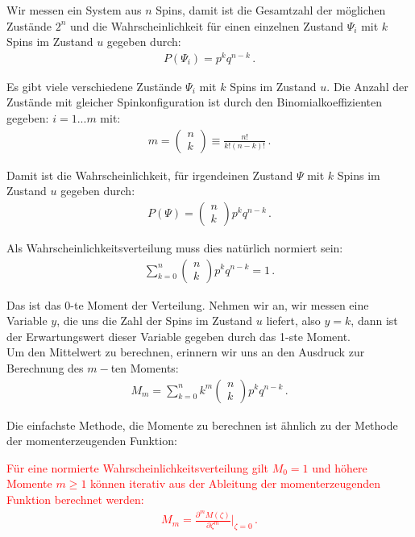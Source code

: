 Wir messen ein System aus $n$ Spins, damit ist die Gesamtzahl der möglichen Zustände $2^n$ und die Wahrscheinlichkeit für einen einzelnen Zustand $\Psi_i$ mit $k$ Spins im Zustand $u$ gegeben durch:
\begin{align}
P (\Psi_i) = p^k q^{n-k}\,.
\label{eq:vl5-4}
\end{align}

Es gibt viele verschiedene Zustände $\Psi_i$ mit $k$ Spins im Zustand $u$. Die Anzahl der Zustände mit gleicher Spinkonfiguration ist durch den Binomialkoeffizienten gegeben: $i = 1 ... m$ mit:
\begin{align}
m = \begin{pmatrix} n\\ k \end{pmatrix} \equiv \frac{ n! }{ k! (n - k)! }\,.
\label{eq:vl5-5}
\end{align}

Damit ist die Wahrscheinlichkeit, für irgendeinen Zustand $\Psi$ mit $k$ Spins im Zustand $u$ gegeben durch:
\begin{align}
P (\Psi) = \begin{pmatrix} n\\ k \end{pmatrix} p^k q^{n-k}\,.
\label{eq:vl5-6}
\end{align}

Als Wahrscheinlichkeitsverteilung muss dies natürlich normiert sein:
\begin{align}
\sum_{k = 0}^n \begin{pmatrix} n\\ k \end{pmatrix} p^k q^{n-k} = 1\,.
\label{eq:vl5-7}
\end{align}

Das ist das 0-te Moment der Verteilung. Nehmen wir an, wir messen eine Variable $y$, die uns die Zahl der Spins
im Zustand $u$ liefert, also $y = k$, dann ist der Erwartungswert dieser Variable gegeben durch das 1-ste Moment.\\[0.3cm]
Um den Mittelwert zu berechnen, erinnern wir uns an den Ausdruck zur Berechnung des $m-$ten Moments:
\begin{align}
M_m = \sum_{k = 0}^n k^m \begin{pmatrix} n \\ k \end{pmatrix} p^k q^{n-k} \,.
\label{eq:vl5-8}
\end{align}

Die einfachste Methode, die Momente zu berechnen ist ähnlich zu der Methode der momenterzeugenden Funktion:
\begin{center}
\textcolor{red}{
Für eine normierte Wahrscheinlichkeitsverteilung gilt $M_0 = 1$ und höhere Momente $m \geq 1$ können iterativ aus der Ableitung der momenterzeugenden Funktion berechnet werden:
\begin{align}
M_m = \frac{ \partial^m M (\zeta) }{ \partial \zeta^m} \bigg|_{\zeta = 0}\,.
\label{eq:vl5-9}
\end{align}}
\end{center}

